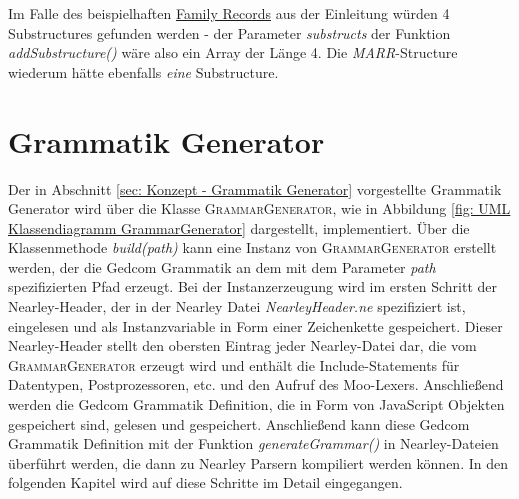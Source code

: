 \vspace{1em}

Im Falle des beispielhaften \hyperref[lst: family record example]{Family Records} aus der Einleitung würden 4 Substructures gefunden werden - der Parameter \textit{substructs} der Funktion \textit{addSubstructure()} wäre also ein Array der Länge 4. Die \textit{MARR}-Structure wiederum hätte ebenfalls \textit{eine} Substructure. 

\section{Grammatik Generator}
\label{sec: Implementierung - Grammatik Generator}
Der in Abschnitt \ref{sec: Konzept - Grammatik Generator} vorgestellte Grammatik Generator wird über die Klasse \textsc{GrammarGenerator}, wie in Abbildung \ref{fig: UML Klassendiagramm GrammarGenerator} dargestellt, implementiert. Über die Klassenmethode \textit{build(path)} kann eine Instanz von \textsc{GrammarGenerator} erstellt werden, der die Gedcom Grammatik an dem mit dem Parameter \textit{path} spezifizierten Pfad erzeugt. Bei der Instanzerzeugung wird im ersten Schritt der Nearley-Header, der in der Nearley Datei \textit{NearleyHeader.ne} spezifiziert ist, eingelesen und als Instanzvariable in Form einer Zeichenkette gespeichert. Dieser Nearley-Header stellt den obersten Eintrag jeder Nearley-Datei dar, die vom \textsc{GrammarGenerator} erzeugt wird und enthält die Include-Statements für Datentypen, Postprozessoren, etc. und den Aufruf des Moo-Lexers. Anschließend werden die Gedcom Grammatik Definition, die in Form von JavaScript Objekten gespeichert sind, gelesen und gespeichert. Anschließend kann diese Gedcom Grammatik Definition mit der Funktion \textit{generateGrammar()} in Nearley-Dateien überführt werden, die dann zu Nearley Parsern kompiliert werden können. In den folgenden Kapitel wird auf diese Schritte im Detail eingegangen.
